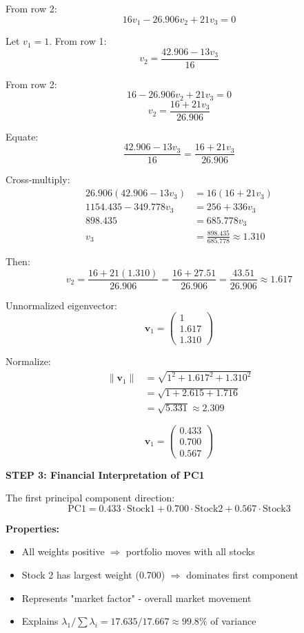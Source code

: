 \documentclass[12pt]{article}
\begin{document}
\begin{solution}
From row 2:
\[
16 v_1 - 26.906 v_2 + 21 v_3 = 0
\]

Let $v_1 = 1$. From row 1:
\[
v_2 = \frac{42.906 - 13v_3}{16}
\]

From row 2:
\[
16 - 26.906 v_2 + 21 v_3 = 0
\]
\[
v_2 = \frac{16 + 21v_3}{26.906}
\]

Equate:
\[
\frac{42.906 - 13v_3}{16} = \frac{16 + 21v_3}{26.906}
\]

Cross-multiply:
\begin{align*}
26.906(42.906 - 13v_3) &= 16(16 + 21v_3) \\
1154.435 - 349.778v_3 &= 256 + 336v_3 \\
898.435 &= 685.778v_3 \\
v_3 &= \frac{898.435}{685.778} \approx 1.310
\end{align*}

Then:
\[
v_2 = \frac{16 + 21(1.310)}{26.906} = \frac{16 + 27.51}{26.906} = \frac{43.51}{26.906} \approx 1.617
\]

Unnormalized eigenvector:
\[
\mathbf{v}_1 = \begin{pmatrix}1 \\ 1.617 \\ 1.310\end{pmatrix}
\]

Normalize:
\begin{align*}
\|\mathbf{v}_1\| &= \sqrt{1^2 + 1.617^2 + 1.310^2} \\
&= \sqrt{1 + 2.615 + 1.716} \\
&= \sqrt{5.331} \approx 2.309
\end{align*}

\[
\boxed{\mathbf{v}_1 = \begin{pmatrix}0.433 \\ 0.700 \\ 0.567\end{pmatrix}}
\]

\textbf{STEP 3: Financial Interpretation of PC1}

The first principal component direction:
\[
\text{PC1} = 0.433 \cdot \text{Stock1} + 0.700 \cdot \text{Stock2} + 0.567 \cdot \text{Stock3}
\]

\textbf{Properties:}
\begin{itemize}
    \item All weights positive $\Rightarrow$ portfolio moves with all stocks
    \item Stock 2 has largest weight (0.700) $\Rightarrow$ dominates first component
    \item Represents "market factor" - overall market movement
    \item Explains $\lambda_1 / \sum \lambda_i = 17.635/17.667 \approx 99.8\%$ of variance
\end{itemize}


\end{solution}
\end{document}
